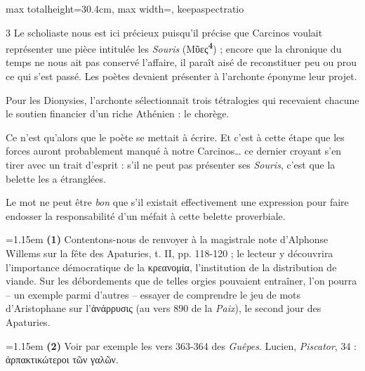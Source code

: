 \documentclass[11pt,twoside]{book}
\newcommand{\italique}[1]{\textit{#1}}
\newcommand{\marqueur}[1]{\textsuperscript{\color{rubricRed}\textbf{#1}}}
\begin{document}
\begin{adjustbox}{max totalheight=30.4cm, max width=\textwidth, keepaspectratio}
\begin{minipage}{\textwidth}
{\fontsize{5.4pt}{6.1pt}\selectfont\begin{multicols}{3}
\noindent Le scholiaste nous est ici précieux puisqu'il précise que Carcinos voulait représenter une pièce intitulée les \italique{Souris} (Μῦες\marqueur{4}) ; encore que la chronique du temps ne nous ait pas conservé l'affaire, il paraît aisé de reconstituer peu ou prou ce qui s'est passé. Les poètes devaient présenter à l'archonte éponyme leur projet.
\par\vspace{1.5pt}
\noindent Pour les Dionysies, l'archonte sélectionnait trois tétralogies qui recevaient chacune le soutien financier d'un riche Athénien : le chorège.
\par\vspace{1.5pt}
\noindent Ce n'est qu'alors que le poète se mettait à écrire. Et c'est à cette étape que les forces auront probablement manqué à notre Carcinos… ce dernier croyant s'en tirer avec un trait d'esprit : s'il ne peut pas présenter ses \italique{Souris}, c'est que la belette les a étranglées.
\par\vspace{1.5pt}
\noindent Le mot ne peut être \italique{bon} que s'il existait effectivement une expression pour faire endosser la responsabilité d'un méfait à cette belette proverbiale.
\par\vspace{1.5pt}
\par\vspace{1.2pt}\par\nopagebreak\vspace{1pt}\noindent\hangindent=1.15em {\color{sepiaNote}\textbf{(1)}} Contentons-nous de renvoyer à la magistrale note d'Alphonse Willems sur la fête des Apaturies, t. II, pp. 118-120 ; le lecteur y découvrira l'importance démocratique de la κρεανομία, l'institution de la distribution de viande. Sur les débordements que de telles orgies pouvaient entraîner, l'on pourra – un exemple parmi d'autres – essayer de comprendre le jeu de mots d'Aristophane sur l'ἀνάρρυσις (au vers 890 de la \italique{Paix}), le second jour des Apaturies.
\par\vspace{1.5pt}
\noindent\hangindent=1.15em {\color{sepiaNote}\textbf{(2)}} Voir par exemple les vers 363-364 des \italique{Guêpes}. Lucien, \italique{Piscator}, 34 : ἁρπακτικώτεροι τῶν γαλῶν.
\par\vspace{1.5pt}

\end{multicols}}
\end{minipage}
\end{adjustbox}
\end{document}
